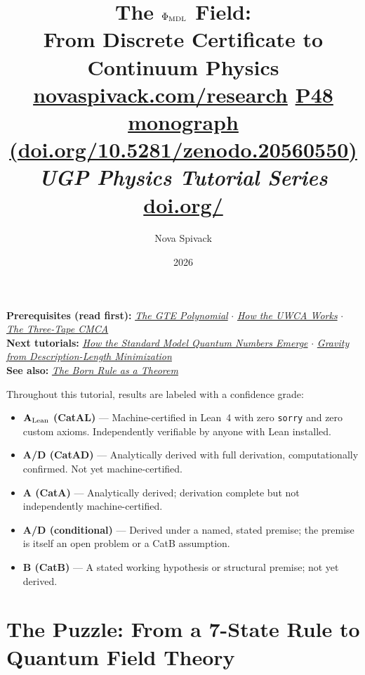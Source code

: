 \documentclass[11pt,a4paper]{article}
\title{\textbf{The \boldmath$\Phi_{\rm MDL}$ Field:}\\[6pt]
\large From Discrete Certificate to Continuum Physics\\[8pt]
\normalsize
\href{https://novaspivack.com/research}{novaspivack.com/research}\quad
\href{https://doi.org/10.5281/zenodo.20560550}{P48 monograph (doi.org/10.5281/zenodo.20560550)}\\[4pt]\normalsize\textit{UGP Physics Tutorial Series}
\\[2pt]\small\href{https://doi.org/\TutorialDOI}{doi.org/\TutorialDOI}}
\author{Nova Spivack}
\date{2026}
\theoremstyle{definition}
\begin{document}
\setcounter{tocdepth}{2}
\maketitle
\tableofcontents
\newpage

\begin{tcolorbox}[colback=blue!6,colframe=blue!40!black,
  title=\textbf{UGP Physics Tutorial Series}]
\textbf{Prerequisites (read first):} \href{https://doi.org/10.5281/zenodo.20657889}{\emph{The GTE Polynomial}} $\cdot$ \href{https://doi.org/10.5281/zenodo.20657919}{\emph{How the UWCA Works}} $\cdot$ \href{https://doi.org/10.5281/zenodo.20657906}{\emph{The Three-Tape CMCA}}\\[4pt]
\textbf{Next tutorials:} \href{https://doi.org/10.5281/zenodo.20657898}{\emph{How the Standard Model Quantum Numbers Emerge}} $\cdot$ \href{https://doi.org/10.5281/zenodo.20657870}{\emph{Gravity from Description-Length Minimization}}\\[4pt]
\textbf{See also:} \href{https://doi.org/10.5281/zenodo.20657861}{\emph{The Born Rule as a Theorem}}
\end{tcolorbox}

\begin{tcolorbox}[colback=boxgreen,colframe=green!50!black,
  title=\textbf{Claim-Strength Taxonomy}]
Throughout this tutorial, results are labeled with a confidence grade:
\begin{itemize}[itemsep=2pt]
  \item \textbf{$\mathbf{A}_{\rm Lean}$ (CatAL)} --- Machine-certified in Lean~4 with zero \texttt{sorry} and zero custom axioms.  Independently verifiable by anyone with Lean installed.
  \item \textbf{A/D (CatAD)} --- Analytically derived with full derivation, computationally confirmed.  Not yet machine-certified.
  \item \textbf{A (CatA)} --- Analytically derived; derivation complete but not independently machine-certified.
  \item \textbf{A/D (conditional)} --- Derived under a named, stated premise; the premise is itself an open problem or a CatB assumption.
  \item \textbf{B (CatB)} --- A stated working hypothesis or structural premise; not yet derived.
\end{itemize}
\end{tcolorbox}


\section{The Puzzle: From a 7-State Rule to Quantum Field Theory}
\label{sec:puzzle}
\end{document}
